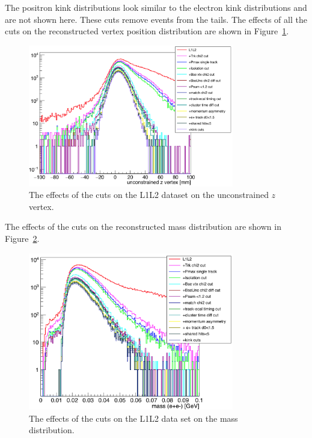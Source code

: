 The positron kink distributions look similar to the electron kink distributions and are not shown here. These cuts remove events from the tails. The effects of all the cuts on the reconstructed vertex position distribution are shown in Figure~\ref{fig:zvtxCuts_l1l2}.

\begin{figure}[H]
  \centering
      \includegraphics[width=0.8\textwidth]{pics/appendix/zvtxCuts_L1L2.png}
  \caption{The effects of the cuts on the L1L2 dataset on the unconstrained $z$ vertex.}
  \label{fig:zvtxCuts_l1l2}
\end{figure} 

The effects of the cuts on the reconstructed mass distribution are shown in Figure~\ref{fig:massCuts_l1l2}.

\begin{figure}[H]
  \centering
      \includegraphics[width=0.8\textwidth]{pics/appendix/massCuts_L1L2.png}
  \caption{The effects of the cuts on the L1L2 data set on the mass distribution.}
  \label{fig:massCuts_l1l2}
\end{figure} 

